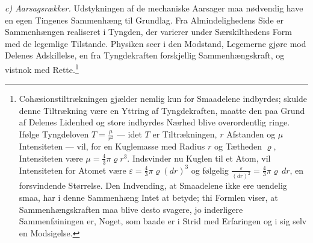 \documentclass[12pt,a4paper]{book}
\newcommand{\runin}[1]{\emph{#1}\hspace{0.4em}}
\begin{document}
\runin{c) Aarsagsrækker.} Udstykningen af de mechaniske Aarsager maa
nødvendig have en egen Tingenes Sammenhæng til Grundlag. Fra
Almindelighedens Side er Sammenhængen realiseret i Tyngden, der varierer
under Særskilthedens Form med de legemlige Tilstande. Physiken seer i den
Modstand, Legemerne gjøre mod Delenes Adskillelse, en fra Tyngdekraften
forskjellig Sammenhængskraft, og vistnok med
Rette.\footnote{%
Cohæsionstiltrækningen gjælder nemlig kun for Smaadelene indbyrdes;
skulde denne Tiltrækning være en Yttring af Tyngdekraften, maatte den paa
Grund af Delenes Lidenhed og store indbyrdes Nærhed blive overordentlig
ringe. Ifølge Tyngdeloven $T = \frac{\mu}{r^{2}}$ --- idet $T$ er
Tiltrækningen, $r$ Afstanden og $\mu$ Intensiteten --- vil, for en
Kuglemasse med Radius $r$ og Tætheden $\varrho$, Intensiteten være
$\mu = \tfrac{4}{3}\pi\varrho r^{3}$. Indsvinder nu Kuglen til et Atom,
vil Intensiteten for Atomet være
$\varepsilon = \tfrac{4}{3}\pi\varrho(dr)^{3}$ og følgelig
$\frac{\varepsilon}{(dr)^{2}} = \tfrac{4}{3}\pi\varrho\, dr$, en
forsvindende Størrelse. Den Indvending, at Smaadelene ikke ere uendelig
smaa, har i denne Sammenhæng Intet at betyde; thi Formlen viser, at
Sammenhængskraften maa blive desto svagere, jo inderligere
Sammenføiningen er, Noget, som baade er i Strid med Erfaringen og i sig
selv en Modsigelse.}
\end{document}
